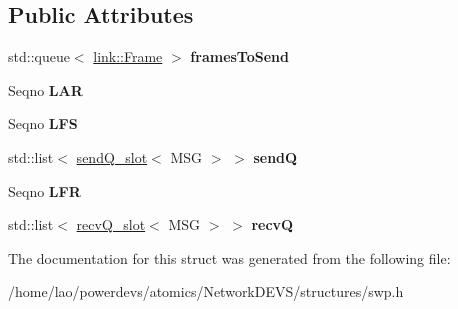 \subsection*{Public Attributes}
\begin{DoxyCompactItemize}
\item 
std\+::queue$<$ \hyperlink{structlink_1_1Frame}{link\+::\+Frame} $>$ {\bfseries frames\+To\+Send}\hypertarget{structswp_1_1State_a8aecc749b9261a8e195f1b696d36f908}{}\label{structswp_1_1State_a8aecc749b9261a8e195f1b696d36f908}

\item 
Seqno {\bfseries L\+AR}\hypertarget{structswp_1_1State_adef64f556048387f44d3f9261b2c51d7}{}\label{structswp_1_1State_adef64f556048387f44d3f9261b2c51d7}

\item 
Seqno {\bfseries L\+FS}\hypertarget{structswp_1_1State_a2a248b3278b4532afe93aaf16e3525c9}{}\label{structswp_1_1State_a2a248b3278b4532afe93aaf16e3525c9}

\item 
std\+::list$<$ \hyperlink{structswp_1_1sendQ__slot}{send\+Q\+\_\+slot}$<$ M\+SG $>$ $>$ {\bfseries sendQ}\hypertarget{structswp_1_1State_abeeef59fd22a2dca5dee970c887eadea}{}\label{structswp_1_1State_abeeef59fd22a2dca5dee970c887eadea}

\item 
Seqno {\bfseries L\+FR}\hypertarget{structswp_1_1State_a90f4fb4d0ccf4822c7e6ac21d38178f6}{}\label{structswp_1_1State_a90f4fb4d0ccf4822c7e6ac21d38178f6}

\item 
std\+::list$<$ \hyperlink{structswp_1_1recvQ__slot}{recv\+Q\+\_\+slot}$<$ M\+SG $>$ $>$ {\bfseries recvQ}\hypertarget{structswp_1_1State_a542ea95d27936e5d09a417c5aa36eb19}{}\label{structswp_1_1State_a542ea95d27936e5d09a417c5aa36eb19}

\end{DoxyCompactItemize}


The documentation for this struct was generated from the following file\+:\begin{DoxyCompactItemize}
\item 
/home/lao/powerdevs/atomics/\+Network\+D\+E\+V\+S/structures/swp.\+h\end{DoxyCompactItemize}
